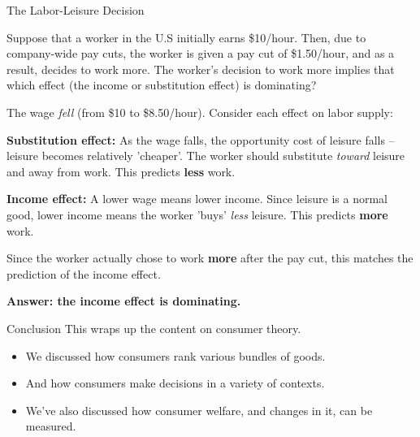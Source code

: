 \documentclass{beamer}
\begin{document}
\begin{frame}{The Labor-Leisure Decision}
  
  \bigskip
  Suppose that a worker in the U.S initially earns \$10/hour. Then, due to company-wide pay cuts, the worker is given a pay cut of \$1.50/hour, and as a result, decides to work more. The worker's decision to work more implies that which effect (the income or substitution effect) is dominating?
\end{frame}

\begin{frame}

  \bigskip
  The wage \emph{fell} (from \$10 to \$8.50/hour). Consider each effect on labor supply:

  \bigskip
  \textbf{Substitution effect:} As the wage falls, the opportunity cost of leisure falls -- leisure becomes relatively 'cheaper'. The worker should substitute \emph{toward} leisure and away from work. This predicts \textbf{less} work.

  \bigskip
  \textbf{Income effect:} A lower wage means lower income. Since leisure is a normal good, lower income means the worker 'buys' \emph{less} leisure. This predicts \textbf{more} work.

  \bigskip
  Since the worker actually chose to work \textbf{more} after the pay cut, this matches the prediction of the income effect.

  \bigskip
  \textbf{Answer: the income effect is dominating.}
\end{frame}

\begin{frame}{Conclusion}
  This wraps up the content on consumer theory.

  \bigskip
  \begin{itemize}
    \item We discussed how consumers rank various bundles of goods.

    \item  And how consumers make decisions in a variety of contexts.

    \item We've also discussed how consumer welfare, and changes in it, can be measured.
  \end{itemize}
\end{frame}
\end{document}
